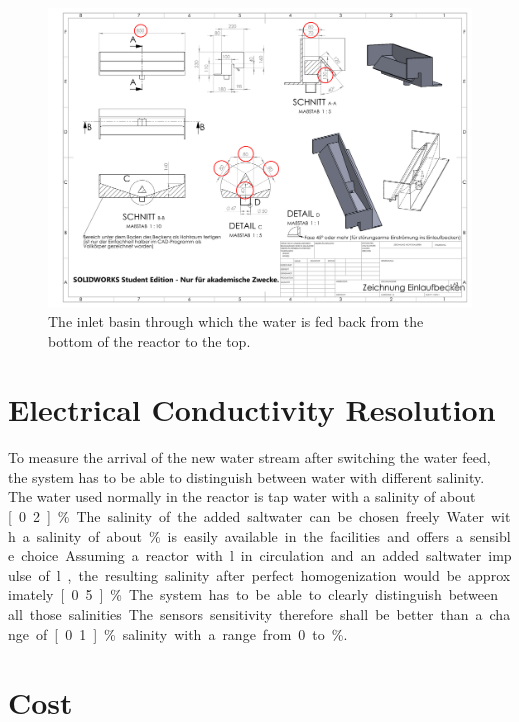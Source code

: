 \begin{figure}
	\begin{center}
		\includegraphics[width=\textwidth]{images/Einlaufbecken.pdf} 
		\caption[The inlet basin.]{The inlet basin through which the water is fed back from the bottom of the reactor to the top.}
		\label{fig:elb}
	\end{center}
\end{figure}

\section{Electrical Conductivity Resolution}

To measure the arrival of the new water stream after switching the water feed, the system has to be able to distinguish between water with different salinity. The water used normally in the reactor is tap water with a salinity of about \unit[0.2]{\%}. The salinity of the added saltwater can be chosen freely. Water with a salinity of about \unit[5]{\%} is easily available in the facilities and offers a sensible choice. Assuming a reactor with \unit[65]{l} in circulation and an added saltwater impulse of \unit[5]{l}, the resulting salinity after perfect homogenization would be approximately \unit[0.5]{\%}. The system has to be able to clearly distinguish between all those salinities. The sensors sensitivity therefore shall be better than a change of \unit[0.1]{\%} salinity with a range from 0 to \unit[5]{\%}.

\section{Cost}

